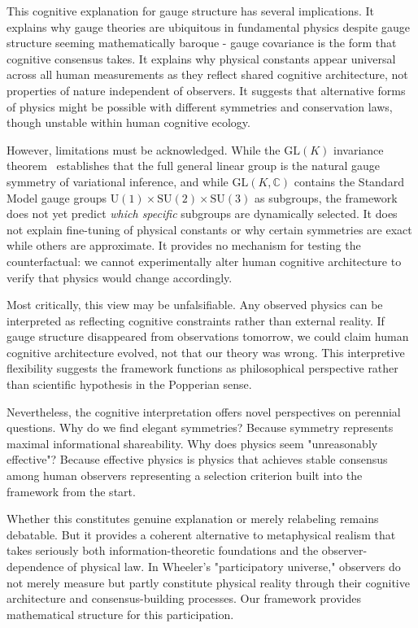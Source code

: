 \documentclass[11pt]{article}
\begin{document}
This cognitive explanation for gauge structure has several implications. It explains why gauge theories are ubiquitous in fundamental physics despite gauge structure seeming mathematically baroque - gauge covariance is the form that cognitive consensus takes. It explains why physical constants appear universal across all human measurements as they reflect shared cognitive architecture, not properties of nature independent of observers. It suggests that alternative forms of physics might be possible with different symmetries and conservation laws, though unstable within human cognitive ecology.

However, limitations must be acknowledged. While the $\mathrm{GL}(K)$ invariance theorem~\cite{Dennis2026GL} establishes that the full general linear group is the natural gauge symmetry of variational inference, and while $\mathrm{GL}(K, \mathbb{C})$ contains the Standard Model gauge groups $\mathrm{U}(1) \times \mathrm{SU}(2) \times \mathrm{SU}(3)$ as subgroups, the framework does not yet predict \emph{which specific} subgroups are dynamically selected. It does not explain fine-tuning of physical constants or why certain symmetries are exact while others are approximate. It provides no mechanism for testing the counterfactual: we cannot experimentally alter human cognitive architecture to verify that physics would change accordingly.

Most critically, this view may be unfalsifiable. Any observed physics can be interpreted as reflecting cognitive constraints rather than external reality. If gauge structure disappeared from observations tomorrow, we could claim human cognitive architecture evolved, not that our theory was wrong. This interpretive flexibility suggests the framework functions as philosophical perspective rather than scientific hypothesis in the Popperian sense.

Nevertheless, the cognitive interpretation offers novel perspectives on perennial questions. Why do we find elegant symmetries? Because symmetry represents maximal informational shareability. Why does physics seem "unreasonably effective"? Because effective physics is physics that achieves stable consensus among human observers representing a selection criterion built into the framework from the start.

Whether this constitutes genuine explanation or merely relabeling remains debatable. But it provides a coherent alternative to metaphysical realism that takes seriously both information-theoretic foundations and the observer-dependence of physical law. In Wheeler's "participatory universe," observers do not merely measure but partly constitute physical reality through their cognitive architecture and consensus-building processes. Our framework provides mathematical structure for this participation.
\end{document}
